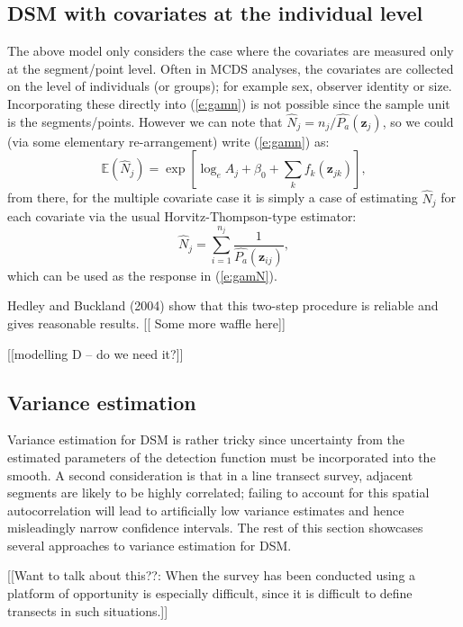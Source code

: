 \documentclass[useAMS,referee]{biom}
\begin{document}
\subsection{DSM with covariates at the individual level}

The above model only considers the case where the covariates are measured only at the segment/point level. Often in MCDS analyses, the covariates are collected on the level of individuals (or groups); for example sex, observer identity or size. Incorporating these directly into (\ref{e:gamn}) is not possible since the sample unit is the segments/points. However we can note that $\hat{N}_j = n_j/\hat{P_a}(\mathbf{z}_j)$, so we could (via some elementary re-arrangement) write (\ref{e:gamn}) as:
\begin{equation}
\mathbb{E}(\hat{N}_j) = \exp\left[ \log_e A_j + \beta_0 + \sum_k f_k\left(\bm{z}_{jk}\right) \right],
\label{e:gamN}
\end{equation}
from there, for the multiple covariate case it is simply a case of estimating $\hat{N}_j$ for each covariate via the usual Horvitz-Thompson-type estimator:
\begin{equation*}
\hat{N}_j = \sum_{i=1}^{n_j} \frac{1}{\hat{P_a}(\mathbf{z}_{ij})},
\end{equation*}
which can be used as the response in (\ref{e:gamN}). 

Hedley and Buckland (2004) show that this two-step procedure is reliable and gives reasonable results. [[ Some more waffle here]]

[[modelling D -- do we need it?]]


\subsection{Variance estimation}

Variance estimation for DSM is rather tricky since uncertainty from the estimated parameters of the detection function must be incorporated into the smooth. A second consideration is that in a line transect survey, adjacent segments are likely to be highly correlated; failing to account for this spatial autocorrelation will lead to artificially low variance estimates and hence misleadingly narrow confidence intervals. The rest of this section showcases several approaches to variance estimation for DSM.

[[Want to talk about this??: When the survey has been conducted using a platform of opportunity is especially difficult, since it is difficult to define transects in such situations.]]
\end{document}
